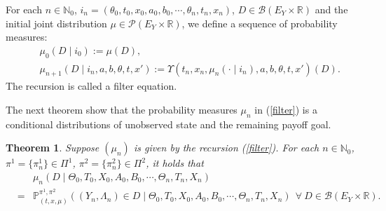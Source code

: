 \documentclass[12pt]{article}
\newtheorem{theorem}{Theorem}
\begin{document}
For each $n\in\mathbb{N}_0$, $i_n=(\theta_0,t_0,x_0,a_0,b_0,\cdots,\theta_n,t_n,x_n)$, $D\in\mathscr{B}(E_Y\times \mathbb{R})$ and the initial joint distribution $\mu\in \mathscr{P}(E_Y\times\mathbb{R})$, we define a sequence of probability measures:
\begin{eqnarray}\label{filter}
&&\mu_0(D\mid i_0):=\mu(D),\nonumber\\
&&\mu_{n+1}(D\mid i_n,a,b,\theta,t,x'):=\Upsilon(t_n,x_n,\mu_n(\cdot\mid i_n),a,b,\theta,t,x')(D).
\end{eqnarray}
The recursion is called a filter equation.

 The next theorem show that the probability measures $\mu_n$ in (\ref{filter}) is a conditional distributions of unobserved state and the remaining payoff goal.

 \begin{theorem}\label{thm1}
 Suppose $(\mu_n)$ is given by the recursion (\ref{filter}).
 For each $n\in\mathbb{N}_0$, $\pi^1=\{\pi_n^1\}\in\Pi^1$, $\pi^2=\{\pi_n^2\}\in\Pi^2$, it holds that
 \begin{eqnarray*}
 &&\mu_n(D\mid \Theta_0,T_0,X_0,A_0,B_0,\cdots,\Theta_n,T_n,X_n)\\
 &=&\mathbb{P}^{\pi^1,\pi^2}_{(t,x,\mu)}((Y_n,\Lambda_n)\in D\mid \Theta_0,T_0,X_0,A_0,B_0,\cdots,\Theta_n,T_n,X_n)~~\forall~D\in\mathscr{B} (E_Y\times\mathbb{R}).
 \end{eqnarray*}
 \end{theorem}
\end{document}
